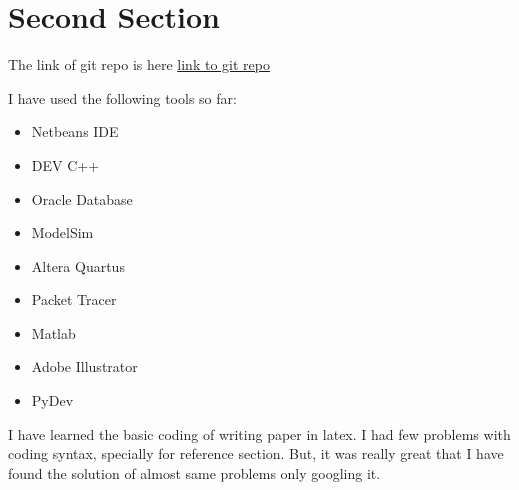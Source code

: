 \documentclass[conference]{IEEEtran}
\begin{document}
\section{Second Section}
The link of git repo is here \href{https://github.com/ArijetSarkerm/latexpaperwriting}{link to git repo}  

I have used the following tools so far:
\begin{itemize}
\item Netbeans IDE
\item DEV C++
\item Oracle Database
\item ModelSim
\item Altera Quartus
\item Packet Tracer
\item Matlab
\item Adobe Illustrator
\item PyDev

\end{itemize}

I have learned the basic coding of writing paper in latex. I had few problems with coding syntax, specially for reference section. But, it was really great that I have found the solution of almost same problems only googling it.   
\end{document}
